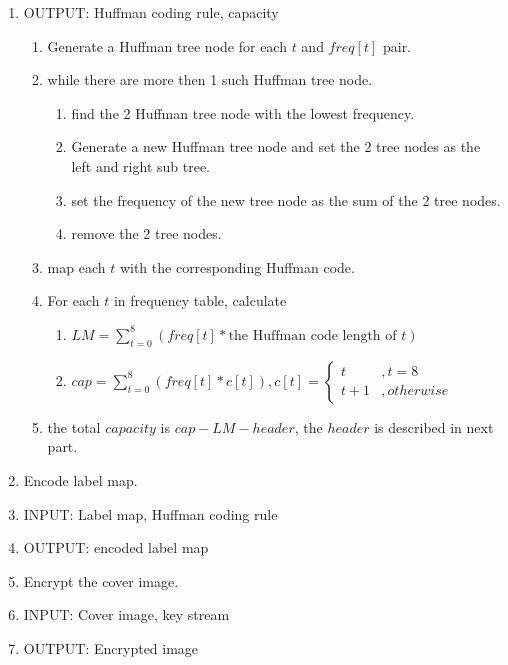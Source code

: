 \documentclass{article}
\begin{document}
\begin{enumerate}
	\item[] OUTPUT: Huffman coding rule, capacity
	      \begin{enumerate}
		      \item Generate a Huffman tree node for each $t$ and $freq[t]$ pair.
		      \item while there are more then 1 such Huffman tree node.
		            \begin{enumerate}
			            \item find the 2 Huffman tree node with the lowest frequency.
			            \item Generate a new Huffman tree node and set the 2 tree nodes as the left and right sub tree.
			            \item set the frequency of the new tree node as the sum of the 2 tree nodes.
			            \item remove the 2 tree nodes.
		            \end{enumerate}
		      \item map each $t$ with the corresponding Huffman code.
		      \item For each $t$ in frequency table, calculate
		            \begin{enumerate}
			            \item $LM = \sum_{t=0}^{8} (freq[t] * \textrm{the Huffman code length of }t) $
			            \item $cap = \sum_{t=0}^{8} (freq[t] * c[t]), c[t] = \left\{
				                  \begin{array}{rl}
					                  t     & , t = 8     \\
					                  t + 1 & , otherwise
				                  \end{array} \right. $
		            \end{enumerate}
		      \item the total $capacity$ is $cap - LM - header$, the $header$ is described in next part.
	      \end{enumerate}
	      
	\item Encode label map.
	\item[] INPUT: Label map, Huffman coding rule
	\item[] OUTPUT: encoded label map
	      
	\item Encrypt the cover image.
	\item[] INPUT: Cover image, key stream
	\item[] OUTPUT: Encrypted image
	      

\end{enumerate}
\end{document}
